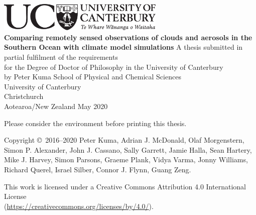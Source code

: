\thispagestyle{empty}
\begin{center}
\centering
\includegraphics[width=0.6\textwidth]{fig/UCBlack_LAN_Te_Reo.pdf}\\
\vfill
\huge
\sffamily
\textbf{Comparing remotely sensed observations of clouds and
aerosols in the Southern Ocean with climate model
simulations}
\normalfont
\vfill
\Large
A thesis submitted in partial fulfilment of the requirements\\
for the Degree of Doctor of Philosophy
in the University of Canterbury\\
by Peter Kuma
\vfill
School of Physical and Chemical Sciences\\
University of Canterbury\\
Christchurch\\
Aotearoa/New Zealand
\vfill
May 2020
\end{center}
\clearpage
\thispagestyle{empty}
\normalfont
\null
\vfill
\noindent
\begin{center}
\large
\noindent
Please consider the environment before printing this thesis.
\end{center}
\vfill
\noindent
Copyright \copyright\ 2016--2020 Peter Kuma,
Adrian J. McDonald, Olaf Morgenstern, Simon P. Alexander, John J. Cassano,
Sally Garrett, Jamie Halla, Sean Hartery, Mike J. Harvey, Simon Parsons,
Graeme Plank, Vidya Varma, Jonny Williams, Richard Querel, Israel Silber, Connor J. Flynn,
Guang Zeng.\\
\par
\noindent
This work is licensed under a Creative Commons Attribution 4.0 International
License\\ (\href{https://creativecommons.org/licenses/by/4.0/}{https://creativecommons.org/licenses/by/4.0/}).
\clearpage
